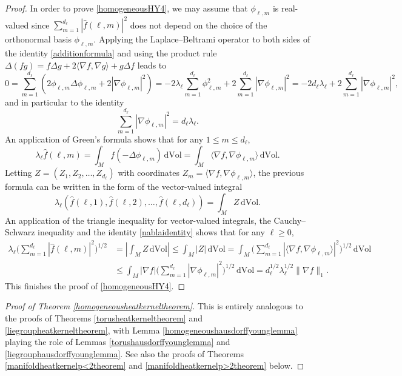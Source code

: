 \documentclass[11pt,a4paper]{article}
\theoremstyle{definition}
\begin{document}
\begin{proof}
In order to prove \eqref{homogeneousHY4}, we may assume that $\phi_{\ell,m}$ is real-valued since $\sum_{m=1}^{d_{\ell}} |\widehat{f}(\ell,m)|^2$ does not depend on the choice of the orthonormal basis $\phi_{\ell,m}$. Applying the Laplace--Beltrami operator to both sides of the identity \eqref{additionformula} and using the product rule $\Delta (fg) = f \Delta g + 2 \langle \nabla f, \nabla g \rangle + g \Delta f$ leads to
\[ 0= \sum_{m=1}^{d_{\ell}} \left( 2 \phi_{\ell,m} \Delta \phi_{\ell,m} + 2 |\nabla \phi_{\ell,m}|^2 \right) = -2 \lambda_{\ell} \sum_{m=1}^{d_{\ell}} \phi_{\ell,m}^2 + 2 \sum_{m=1}^{d_{\ell}} |\nabla \phi_{\ell,m}|^2 = -2d_{\ell} \lambda_{\ell} + 2 \sum_{m=1}^{d_{\ell}} |\nabla \phi_{\ell,m}|^2 , \]
and in particular to the identity
\begin{equation}\label{nablaidentity}
\sum_{m=1}^{d_{\ell}} |\nabla \phi_{\ell,m}|^2 = d_{\ell} \lambda_{\ell} .
\end{equation}
An application of Green's formula shows that for any $1 \le m \le d_{\ell}$,
\[ \lambda_{\ell} \widehat{f}(\ell,m) = \int_M f (-\Delta \phi_{\ell,m}) \, \mathrm{d}\mathrm{Vol} = \int_M \langle \nabla f, \nabla \phi_{\ell,m} \rangle \, \mathrm{d}\mathrm{Vol} . \]
Letting $Z=(Z_1, Z_2, \ldots, Z_{d_{\ell}})$ with coordinates $Z_m=\langle \nabla f, \nabla \phi_{\ell,m} \rangle$, the previous formula can be written in the form of the vector-valued integral
\[ \lambda_{\ell} (\widehat{f}(\ell,1), \widehat{f}(\ell,2), \ldots, \widehat{f}(\ell,d_{\ell})) = \int_M Z \, \mathrm{d}\mathrm{Vol} . \]
An application of the triangle inequality for vector-valued integrals, the Cauchy--Schwarz inequality and the identity \eqref{nablaidentity} shows that for any $\ell \ge 0$,
\[ \begin{split} \lambda_{\ell} \Bigg( \sum_{m=1}^{d_{\ell}} |\widehat{f}(\ell,m)|^2 \Bigg)^{1/2} &= \left| \int_M Z \, \mathrm{d}\mathrm{Vol} \right| \le \int_M |Z| \, \mathrm{d}\mathrm{Vol} = \int_M \Bigg( \sum_{m=1}^{d_{\ell}} |\langle \nabla f, \nabla \phi_{\ell,m} \rangle|^2 \Bigg)^{1/2} \, \mathrm{d}\mathrm{Vol} \\ &\le \int_M |\nabla f| \Bigg( \sum_{m=1}^{d_{\ell}} |\nabla \phi_{\ell,m}|^2 \Bigg)^{1/2} \, \mathrm{d}\mathrm{Vol} = d_{\ell}^{1/2} \lambda_{\ell}^{1/2} \| \nabla f \|_1 . \end{split} \]
This finishes the proof of \eqref{homogeneousHY4}.
\end{proof}

\begin{proof}[Proof of Theorem \ref{homogeneousheatkerneltheorem}] This is entirely analogous to the proofs of Theorems \ref{torusheatkerneltheorem} and \ref{liegroupheatkerneltheorem}, with Lemma \ref{homogeneoushausdorffyounglemma} playing the role of Lemmas \ref{torushausdorffyounglemma} and \ref{liegrouphausdorffyounglemma}. See also the proofs of Theorems \ref{manifoldheatkernelp<2theorem} and \ref{manifoldheatkernelp>2theorem} below.
\end{proof}
\end{document}

